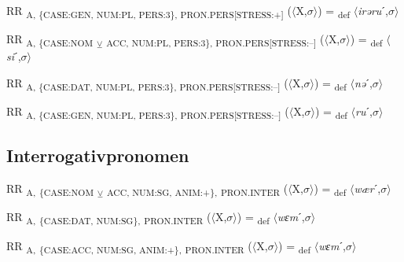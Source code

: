 {\begin{exe}
 RR \textsubscript{A, \{CASE:GEN, NUM:PL, PERS:3\}, PRON.PERS[STRESS:+]} ($\langle$X,$\sigma $$\rangle$) = \textsubscript{def} $\langle$\textit{irəru}ˊ,$\sigma $$\rangle$
\end{exe}

\begin{exe}
 RR \textsubscript{A, \{CASE:NOM} \textsubscript{${\veebar}$}\textsubscript{ ACC, NUM:PL, PERS:3\}, PRON.PERS[STRESS:–]} ($\langle$X,$\sigma $$\rangle$) = \textsubscript{def} $\langle$\textit{si}ˊ,$\sigma $$\rangle$
\end{exe}

\begin{exe}
 RR \textsubscript{A, \{CASE:DAT, NUM:PL, PERS:3\}, PRON.PERS[STRESS:–]} ($\langle$X,$\sigma $$\rangle$) = \textsubscript{def} $\langle$\textit{nə}ˊ,$\sigma $$\rangle$
\end{exe}

\begin{exe}
 RR \textsubscript{A, \{CASE:GEN, NUM:PL, PERS:3\}, PRON.PERS[STRESS:–]} ($\langle$X,$\sigma $$\rangle$) = \textsubscript{def} $\langle$\textit{ru}ˊ,$\sigma $$\rangle$
\end{exe}

\subsection{Interrogativpronomen}

\begin{exe}
 RR \textsubscript{A,} \textsubscript{\{CASE:NOM} \textsubscript{${\veebar}$}\textsubscript{ ACC, NUM:SG, ANIM:+\},} \textsubscript{PRON.INTER} ($\langle$X,$\sigma $$\rangle$) = \textsubscript{def} $\langle$\textit{wær}ˊ,$\sigma $$\rangle$
\end{exe}

\begin{exe}
 RR \textsubscript{A,} \textsubscript{\{CASE:DAT, NUM:SG\},} \textsubscript{PRON.INTER} ($\langle$X,$\sigma $$\rangle$) = \textsubscript{def} $\langle$\textit{wɛm}ˊ,$\sigma $$\rangle$
\end{exe}

\begin{exe}
 RR \textsubscript{A,} \textsubscript{\{CASE:ACC, NUM:SG, ANIM:+\},} \textsubscript{PRON.INTER} ($\langle$X,$\sigma $$\rangle$) = \textsubscript{def} $\langle$\textit{wɛm}ˊ,$\sigma $$\rangle$
\end{exe}

}
